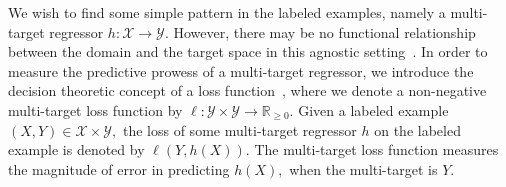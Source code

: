 \documentclass[aps,twocolumn,superscriptaddress,floatfix,preprintnumbers,showkeys]{revtex4}
\begin{document}
We wish to find some simple pattern in the labeled examples, namely a multi-target regressor 
$ h: \mathcal{X} \to \mathcal{Y}.$
However, there may be no functional relationship between the domain and the target space in this agnostic setting~\cite{Kearns_1994_1, Kearns_1994_2}. In order to measure the predictive prowess of a multi-target regressor, we introduce the decision theoretic concept of a loss function~\cite{Haussler_1992, Kearns_1994_1, Kearns_1994_2, Friedman_2001, Friedman_2003, Hastie_2009}, where we denote a non-negative multi-target loss function by 
$\ell: \mathcal{Y} \times \mathcal{Y} \to \mathbb{R}_{\geq 0}.$
Given a labeled example $(X,Y) \in \mathcal{X} \times \mathcal{Y},$ the loss of some multi-target regressor $h$ on the labeled example is denoted by $\ell(Y, h(X)).$ The multi-target loss function measures the magnitude of error in predicting $h(X),$ when the multi-target is $Y.$ 
\end{document}
